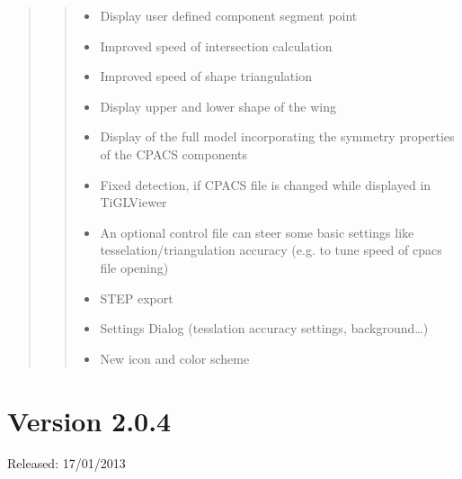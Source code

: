 \documentclass[]{scrartcl}
\begin{document}
\begin{quote}
\begin{itemize}
  \begin{quote}
  \begin{itemize}
  \itemsep1pt\parskip0pt
  \item
    Display user defined component segment point
  \item
    Improved speed of intersection calculation
  \item
    Improved speed of shape triangulation
  \item
    Display upper and lower shape of the wing
  \item
    Display of the full model incorporating the symmetry properties of
    the CPACS components
  \item
    Fixed detection, if CPACS file is changed while displayed in
    TiGLViewer
  \item
    An optional control file can steer some basic settings like
    tesselation/triangulation accuracy (e.g. to tune speed of cpacs file
    opening)
  \item
    STEP export
  \item
    Settings Dialog (tesslation accuracy settings, background\ldots{})
  \item
    New icon and color scheme
  \end{itemize}
  \end{quote}
\end{itemize}
\end{quote}

\section{Version 2.0.4}\label{version-2.0.4}

Released: 17/01/2013
\end{document}
